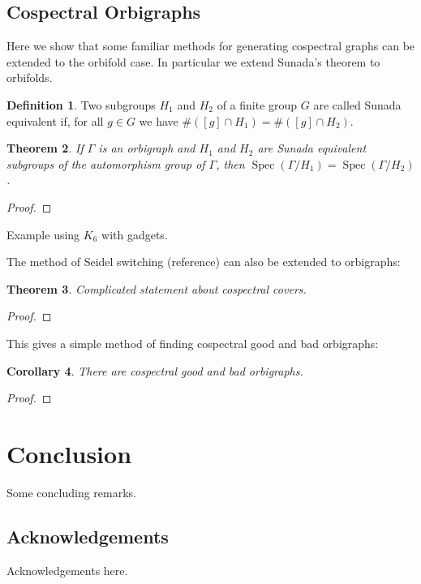 \documentclass[12pt]{article}
\theoremstyle{plain}
\newtheorem{theorem}{Theorem}
\newtheorem{corollary}[theorem]{Corollary}
\theoremstyle{definition}
\newtheorem{definition}[theorem]{Definition}
\theoremstyle{remark}
\DeclareMathOperator*{\spec}{Spec}
\begin{document}
  \subsection{Cospectral Orbigraphs}

  Here we show that some familiar methods for generating cospectral graphs can be extended to the orbifold case. In particular we extend Sunada's theorem to orbifolds.

  \begin{definition}\label{SunadaEquivalentDefn}
    Two subgroups $H_1$ and $H_2$  of a finite group $G$ are called Sunada equivalent if, for all $g \in G$ we have $\#([g] \cap H_1) = \#([g] \cap H_2)$.
  \end{definition}

  \begin{theorem}\label{Sunada}
    If $\Gamma$ is an orbigraph and $H_1$ and $H_2$ are Sunada equivalent subgroups of the automorphism group of $\Gamma$, then $\spec(\Gamma / H_1) = \spec(\Gamma / H_2)$.
  \end{theorem}
  \begin{proof}
    
  \end{proof}

  Example using $K_6$ with gadgets.

  The method of Seidel switching (reference) can also be extended to orbigraphs:

  \begin{theorem}\label{SeidelSwitching}
    Complicated statement about cospectral covers.
  \end{theorem}
  \begin{proof}
  \end{proof}

  This gives a simple method of finding cospectral good and bad orbigraphs:

  \begin{corollary}\label{GoodBadCospectral}
    There are cospectral good and bad orbigraphs.
  \end{corollary}
  \begin{proof}
  \end{proof}


\section{Conclusion}
  Some concluding remarks.


\subsection*{Acknowledgements}
  Acknowledgements here.


%  
%  

\begin{thebibliography}{10}

\end{thebibliography}
\end{document}
